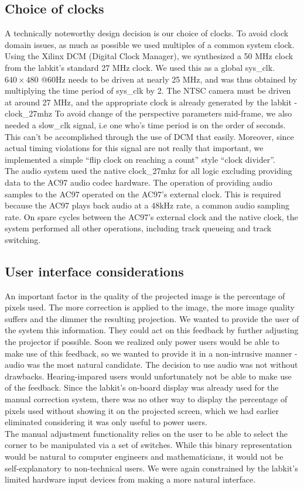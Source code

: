 \documentclass{article}
\begin{document}
\subsection{Choice of clocks}
A technically noteworthy design decision is our choice of clocks.
To avoid clock domain issues, as much as possible we used multiples of a common system clock.
Using the Xilinx DCM (Digital Clock Manager), we synthesized a 50 MHz clock from the labkit's standard 27 MHz clock.
We used this as a global sys\_clk.
$640 \times 480$ @60Hz needs to be driven at nearly 25 MHz, and was thus obtained by multiplying the time period of sys\_clk by 2.
The NTSC camera must be driven at around 27 MHz, and the appropriate clock is already generated by the labkit - clock\_27mhz
To avoid change of the perspective parameters mid-frame, we also needed a slow\_clk signal,
i.e one who's time period is on the order of seconds.
This can't be accomplished through the use of DCM that easily.
Moreover, since actual timing violations for this signal are not really that important,
we implemented a simple ``flip clock on reaching a count'' style ``clock divider''.
\\The audio system used the native clock\_27mhz for all logic excluding providing data to the AC97 audio codec hardware. The operation of providing audio samples to the AC97 operated on the AC97's external clock. This is required because the AC97 plays back audio at a 48kHz rate, a common audio sampling rate. On spare cycles between the AC97's external clock and the native clock, the system performed all other operations, including track queueing and track switching. 

\subsection{User interface considerations}
An important factor in the quality of the projected image is the percentage of pixels used.
The more correction is applied to the image, the more image quality suffers and the dimmer the resulting projection. 
We wanted to provide the user of the system this information. 
They could act on this feedback by further adjusting the projector if possible. 
Soon we realized only power users would be able to make use of this feedback, so we wanted to provide it in a non-intrusive manner - audio was the most natural candidate.
The decision to use audio was not without drawbacks. 
Hearing-impared users would unfortunately not be able to make use of the feedback. 
Since the labkit's on-board display was already used for the manual correction system, there was no other way to display the percentage of pixels used without showing it on the projected screen, which we had earlier eliminated considering it was only useful to power users. 
\\The manual adjustment functionality relies on the user to be able to select the corner to be manipulated via a set of switches. While this binary representation would be natural to computer engineers and mathematicians, it would not be self-explanatory to non-technical users. We were again constrained by the labkit's limited hardware input devices from making a more natural interface. 
\end{document}
